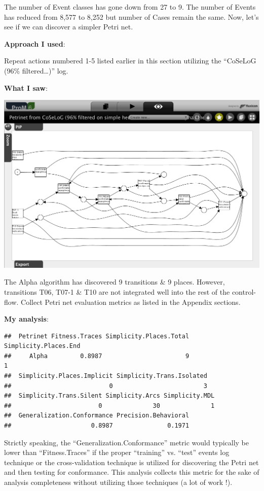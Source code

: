 \documentclass[]{article}
\begin{document}
The number of Event classes has gone down from 27 to 9. The number of
Events has reduced from 8,577 to 8,252 but number of Cases remain the
same. Now, let's see if we can discover a simpler Petri net.

\textbf{Approach I used}:

Repeat actions numbered 1-5 listed earlier in this section utilizing the
``CoSeLoG (96\% filtered\ldots{})'' log.

\textbf{What I saw}:

\includegraphics{CoSeLoG_Step_05_Filter96_PetriNet_Alpha.png}

The Alpha algorithm has discovered 9 transitions \& 9 places. However,
transitions T06, T07-1 \& T10 are not integrated well into the rest of
the control-flow. Collect Petri net evaluation metrics as listed in the
Appendix sections.

\textbf{My analysis}:

\begin{verbatim}
##  Petrinet Fitness.Traces Simplicity.Places.Total Simplicity.Places.End
##     Alpha         0.8987                       9                     1
##  Simplicity.Places.Implicit Simplicity.Trans.Isolated
##                           0                         3
##  Simplicity.Trans.Silent Simplicity.Arcs Simplicity.MDL
##                        0              30              1
##  Generalization.Conformance Precision.Behavioral
##                      0.8987               0.1971
\end{verbatim}

Strictly speaking, the ``Generalization.Conformance'' metric would
typically be lower than ``Fitness.Traces'' if the proper ``training''
vs. ``test'' events log technique or the cross-validation technique is
utilized for discovering the Petri net and then testing for conformance.
This analysis collects this metric for the sake of analysis completeness
without utilizing those techniques (a lot of work !).
\end{document}

